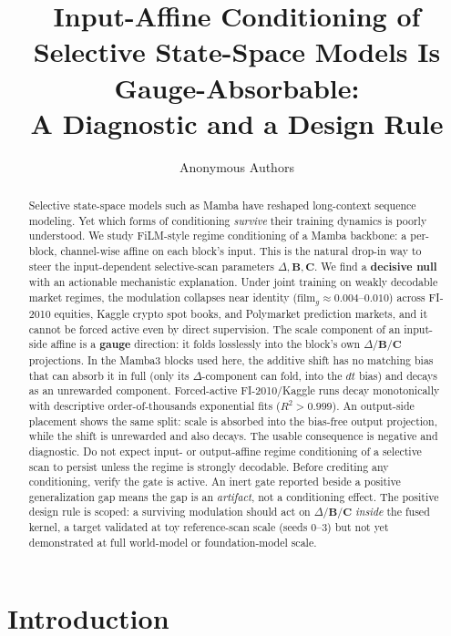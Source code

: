 \documentclass{article}
\title{Input-Affine Conditioning of Selective State-Space Models Is
Gauge-Absorbable:\\ A Diagnostic and a Design Rule}
\author{Anonymous Authors}
\begin{document}
\maketitle

\ifcolmsubmission
\linenumbers
\fi

\begin{abstract}
Selective state-space models such as Mamba have reshaped long-context sequence
modeling. Yet which forms of conditioning \emph{survive} their training dynamics is
poorly understood. We study FiLM-style regime conditioning of a Mamba backbone: a
per-block, channel-wise affine on each block's input. This is the natural drop-in
way to steer the input-dependent selective-scan parameters
$\Delta,\mathbf{B},\mathbf{C}$. We find a \textbf{decisive null} with an actionable
mechanistic explanation. Under joint training on weakly decodable market regimes,
the modulation collapses near identity
($\mathrm{film}_g\approx0.004$--$0.010$) across FI-2010 equities, Kaggle crypto spot
books, and Polymarket prediction markets, and it cannot be forced active even by
direct supervision. The scale component of an input-side affine is a
\textbf{gauge} direction: it folds losslessly into the block's own
$\Delta/\mathbf{B}/\mathbf{C}$ projections. In the Mamba3 blocks used
here, the additive shift has no matching bias that can absorb it in full (only its
$\Delta$-component can fold, into the $dt$ bias) and decays as an unrewarded
component.
Forced-active FI-2010/Kaggle runs decay monotonically with descriptive
order-of-thousands exponential fits ($R^2>0.999$). An output-side placement shows
the same split: scale is absorbed into the bias-free output projection, while the
shift is unrewarded and also decays. The usable consequence is negative and
diagnostic. Do not expect input- or output-affine regime conditioning of a
selective scan to persist unless the regime is strongly decodable. Before crediting
any conditioning, verify the gate is active. An inert gate reported beside a
positive generalization gap means the gap is an \emph{artifact}, not a conditioning
effect. The positive design rule is scoped: a surviving modulation should act on
$\Delta/\mathbf{B}/\mathbf{C}$ \emph{inside} the fused kernel, a target validated at
toy reference-scan scale (seeds 0--3) but not yet demonstrated at full world-model
or foundation-model scale.
\end{abstract}

\section{Introduction}\label{sec:intro}
\end{document}
